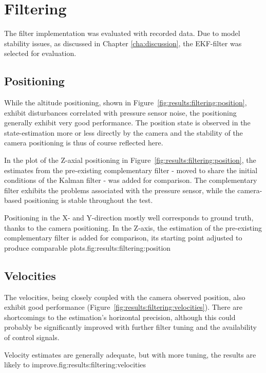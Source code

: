 \section{Filtering}
\label{sec:results:filtering}
The filter implementation was evaluated with recorded data.
Due to model stability issues, as discussed in Chapter \ref{cha:discussion},
the EKF-filter was selected for evaluation.

\subsection{Positioning}
    While the altitude positioning, shown in Figure~\ref{fig:results:filtering:position},
    exhibit disturbances correlated with pressure sensor noise,
    the positioning generally exhibit very good performance. The position state
    is observed in the state-estimation more or less directly by the camera
    and the stability of the camera positioning is thus of course reflected here.

    In the plot of the Z-axial positioning in Figure~\ref{fig:results:filtering:position},
    the estimates from the pre-existing complementary filter -
    moved to share the initial conditions of the Kalman filter - was added for
    comparison. The complementary filter exhibits the problems associated
    with the pressure sensor, while the camera-based positioning is stable
    throughout the test.

    \begin{subfigures}{Positioning in the X- and Y-direction mostly well corresponds to ground truth, thanks to the camera positioning.
    In the Z-axis, the estimation of the pre-existing complementary filter is added for comparison, its starting point adjusted to produce comparable plots.}{fig:results:filtering:position}
    \end{subfigures}

\subsection{Velocities}
    The velocities, being closely coupled with the camera observed position,
    also exhibit good performance (Figure~\ref{fig:results:filtering:velocities}).
    There are shortcomings to the estimation's horizontal precision, although
    this could probably be significantly improved with further filter tuning
    and the availability of control signals.
    \begin{subfigures}{Velocity estimates are generally adequate, but with more tuning, the results are likely to improve.}{fig:results:filtering:velocities}
    \end{subfigures}

